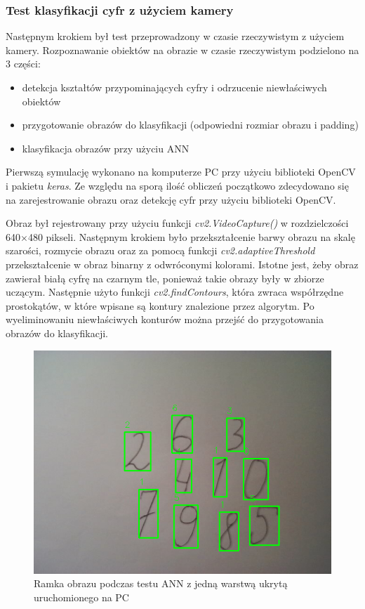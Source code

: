 \subsubsection{Test klasyfikacji cyfr z użyciem kamery}

Następnym krokiem był test przeprowadzony w czasie rzeczywistym z użyciem kamery. Rozpoznawanie obiektów na obrazie w czasie rzeczywistym podzielono na 3 części:
\begin{itemize}
    \item detekcja kształtów przypominających cyfry i odrzucenie niewłaściwych obiektów
    \item przygotowanie obrazów do klasyfikacji (odpowiedni rozmiar obrazu i padding)
    \item klasyfikacja obrazów przy użyciu ANN
\end{itemize}

Pierwszą symulację wykonano na komputerze PC przy użyciu biblioteki OpenCV i pakietu \emph{keras}.
Ze względu na sporą ilość obliczeń początkowo zdecydowano się na zarejestrowanie obrazu oraz 
detekcję cyfr przy użyciu biblioteki OpenCV. 

Obraz był rejestrowany przy użyciu funkcji \emph{cv2.VideoCapture()} w rozdzielczości 640$\times$480 pikseli. 
Następnym krokiem było przekształcenie barwy obrazu na skalę szarości, rozmycie obrazu oraz 
za pomocą funkcji \emph{cv2.adaptiveThreshold} przekształcenie w obraz binarny z odwróconymi 
kolorami. Istotne jest, żeby obraz zawierał białą cyfrę na czarnym tle, ponieważ takie obrazy były 
w zbiorze uczącym.  Następnie użyto funkcji \emph{cv2.findContours}, która zwraca współrzędne 
prostokątów, w które wpisane są kontury znalezione przez algorytm. Po wyeliminowaniu niewłaściwych 
konturów można przejść do przygotowania obrazów do klasyfikacji. 

\begin{figure}[!h]
    \centering
    \includegraphics[width=\textwidth]{img/1hid-layer-pc-img.png}
    \caption{Ramka obrazu podczas testu ANN z jedną warstwą ukrytą uruchomionego na PC}
    \label{1hid-layer-pc-img}
  \end{figure}

